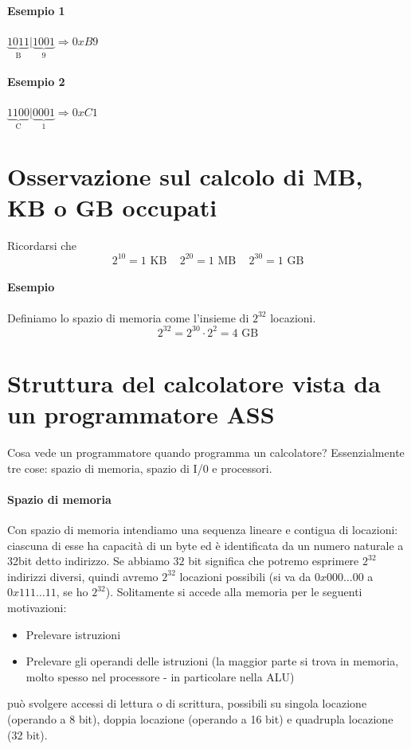 \documentclass[11pt]{report}
\begin{document}
\paragraph{Esempio 1} $\underbrace{1011}_{\text{B}}|\underbrace{1001}_{9} \Longrightarrow 0xB9$
\paragraph{Esempio 2} $\underbrace{1100}_{\text{C}}|\underbrace{0001}_{1} \Longrightarrow 0xC1$
\section{Osservazione sul calcolo di MB, KB o GB occupati}
Ricordarsi che 
\[\boxed{2^{10}=1\text{ KB}}\,\,\,\,\,\,\,\boxed{2^{20}=1\text{ MB}}\,\,\,\,\,\,\,\boxed{2^{30}=1\text{ GB}}\]
\paragraph{Esempio} Definiamo lo spazio di memoria come l'insieme di $2^{32}$ locazioni.
\[2^{32}=2^{30} \cdot 2^2 = 4\text{ GB}\]
\clearpage
\section{Struttura del calcolatore vista da un programmatore ASS}
Cosa vede un programmatore quando programma un calcolatore? Essenzialmente tre cose: spazio di memoria, spazio di I/0 e processori.
\paragraph{Spazio di memoria}
Con spazio di memoria intendiamo una sequenza lineare e contigua di locazioni: ciascuna di esse ha capacità di un byte ed è identificata da un numero naturale a 32bit detto indirizzo. Se abbiamo $32$ bit significa che potremo esprimere $2^{32}$ indirizzi diversi, quindi avremo $2^{32}$ locazioni possibili (si va da $0x000\dots 00$ a $0x111\dots 11$, se ho $2^{32}$).  Solitamente si accede alla memoria per le seguenti motivazioni:
\begin{itemize}
\item Prelevare istruzioni
\item Prelevare gli operandi delle istruzioni (la maggior parte si trova in memoria, molto spesso nel processore - in particolare nella ALU)
\end{itemize}
può svolgere accessi di lettura o di scrittura, possibili su singola locazione (operando a 8 bit), doppia locazione (operando a 16 bit) e quadrupla locazione (32 bit).
\end{document}
